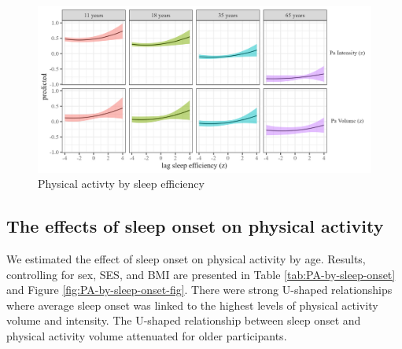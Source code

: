 \documentclass[
  man]{apa6}
\begin{document}
\begin{figure}
\includegraphics[width=7.08in]{../Figures/Pa on sleep_efficiency_lag} \caption{Physical activty by sleep efficiency}\label{fig:PA-by-sleep-efficiency-fig}
\end{figure}

\hypertarget{the-effects-of-sleep-onset-on-physical-activity}{%
\subsection{The effects of sleep onset on physical activity}\label{the-effects-of-sleep-onset-on-physical-activity}}

We estimated the effect of sleep onset on physical activity by age. Results, controlling for sex, SES, and BMI are presented in Table \ref{tab:PA-by-sleep-onset} and Figure \ref{fig:PA-by-sleep-onset-fig}. There were strong U-shaped relationships where average sleep onset was linked to the highest levels of physical activity volume and intensity. The U-shaped relationship between sleep onset and physical activity volume attenuated for older participants.
\end{document}
